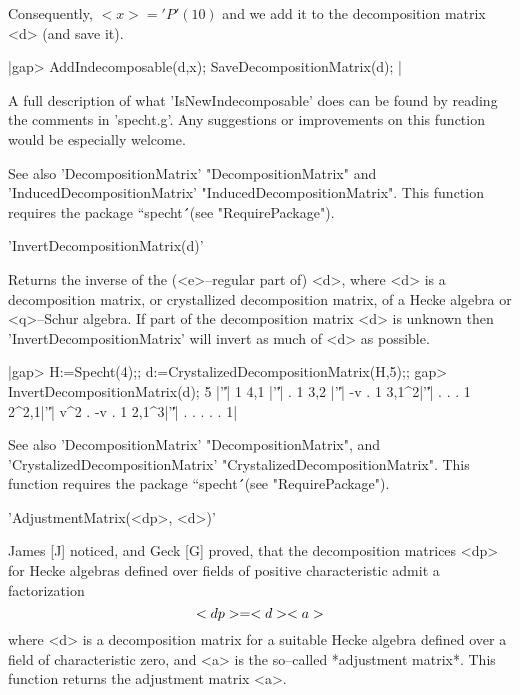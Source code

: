 Consequently, $<x>='P'(10)$ and we add it to the decomposition matrix 
<d> (and save it).

|gap> AddIndecomposable(d,x); SaveDecompositionMatrix(d); |

A full description of what 'IsNewIndecomposable' does can be found by
reading the comments in 'specht.g'. Any suggestions or improvements on 
this function would be especially welcome.

See also 'DecompositionMatrix' "DecompositionMatrix" and
'InducedDecompositionMatrix' "InducedDecompositionMatrix". This function 
requires the package ``specht\'\'\ (see "RequirePackage").



'InvertDecompositionMatrix(d)'

Returns the inverse of the (<e>--regular part of) <d>, where <d> is a
decomposition matrix, or crystallized decomposition matrix, of a Hecke
algebra or <q>--Schur algebra. If part of the decomposition matrix <d>
is unknown then 'InvertDecompositionMatrix' will invert as much of <d>
as possible.

|gap> H:=Specht(4);; d:=CrystalizedDecompositionMatrix(H,5);;
gap> InvertDecompositionMatrix(d);
5    |'\|'|   1                     
4,1  |'\|'|   .   1                 
3,2  |'\|'|  -v   .   1             
3,1^2|'\|'|   .   .   .   1         
2^2,1|'\|'| v^2   .  -v   .   1     
2,1^3|'\|'|   .   .   .   .   .   1|

See also 'DecompositionMatrix' "DecompositionMatrix", and
'CrystalizedDecompositionMatrix' "CrystalizedDecompositionMatrix". This 
function requires the package ``specht\'\'\ (see "RequirePackage").



'AdjustmentMatrix(<dp>, <d>)'

James [J] noticed, and Geck [G] proved, that the decomposition
matrices
<dp> for Hecke algebras defined over fields of positive characteristic
admit a factorization
        $$             <dp> = <d> \* <a>         $$
where <d> is a decomposition matrix for a suitable Hecke algebra
defined over a field of characteristic zero, and <a> is the so--called
*adjustment matrix*. This function returns the adjustment matrix <a>.

